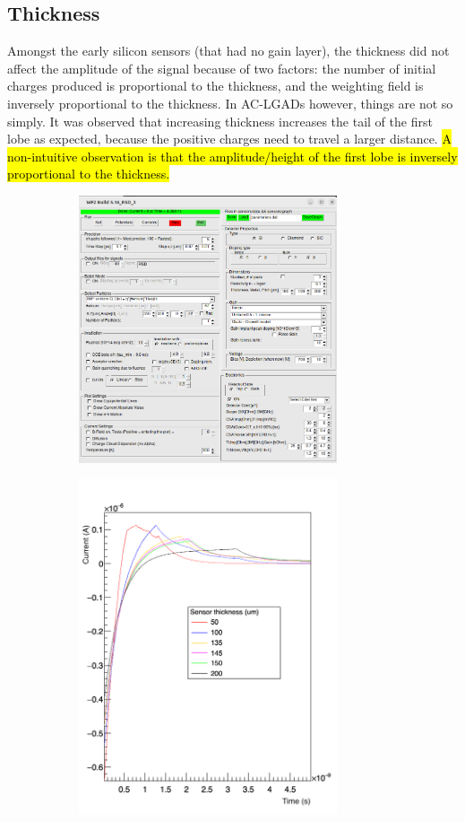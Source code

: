 \documentclass[11pt]{article}
\newcommand{\hlyellow}[1]{{\sethlcolor{yellow}\hl{#1}}}
\begin{document}
\subsection{Thickness}
Amongst the early silicon sensors (that had no gain layer), the thickness did not affect the amplitude of the signal because of two factors: the number of initial charges produced is proportional to the thickness, and the weighting field is inversely proportional to the thickness. In AC-LGADs however, things are not so simply. It was observed that increasing thickness increases the tail of the first lobe as expected, because the positive charges need to travel a larger distance. \hlyellow{A non-intuitive observation is that the amplitude/height of the first lobe is inversely proportional to the thickness.}

\begin{figure}[h!]
    \centering
    \begin{subfigure}[t]{0.49\textwidth}
        \centering
        \includegraphics[width=3in]{Images/thickness_other_settings.png}
        \caption{}
        \label{fig:thickness_other_settings}
    \end{subfigure}%
    \begin{subfigure}[t]{0.49\textwidth}
        \centering
        \includegraphics[width=3in]{Images/thickness_plot.png}

\end{subfigure}
\end{figure}
\end{document}
